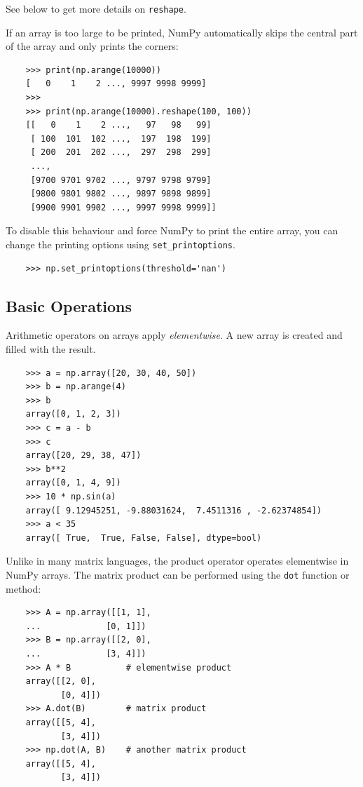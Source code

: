 \documentclass[UTF8]{article}
\begin{document}
See below to get more details on \texttt{reshape}.

If an array is too large to be printed, NumPy automatically skips the central part of the array and
only prints the corners:
\begin{verbatim}
    >>> print(np.arange(10000))
    [   0    1    2 ..., 9997 9998 9999]
    >>>
    >>> print(np.arange(10000).reshape(100, 100))
    [[   0    1    2 ...,   97   98   99]
     [ 100  101  102 ...,  197  198  199]
     [ 200  201  202 ...,  297  298  299]
     ...,
     [9700 9701 9702 ..., 9797 9798 9799]
     [9800 9801 9802 ..., 9897 9898 9899]
     [9900 9901 9902 ..., 9997 9998 9999]]
\end{verbatim}

To disable this behaviour and force NumPy to print the entire array, you can change the printing
options using \texttt{set\_printoptions}.
\begin{verbatim}
    >>> np.set_printoptions(threshold='nan')
\end{verbatim}

\subsection{Basic Operations}
Arithmetic operators on arrays apply \emph{elementwise}. A new array is created and filled with the
result.
\begin{verbatim}
    >>> a = np.array([20, 30, 40, 50])
    >>> b = np.arange(4)
    >>> b
    array([0, 1, 2, 3])
    >>> c = a - b
    >>> c
    array([20, 29, 38, 47])
    >>> b**2
    array([0, 1, 4, 9])
    >>> 10 * np.sin(a)
    array([ 9.12945251, -9.88031624,  7.4511316 , -2.62374854])
    >>> a < 35
    array([ True,  True, False, False], dtype=bool)
\end{verbatim}

Unlike in many matrix languages, the product operator \texttt{\*} operates elementwise in NumPy
arrays. The matrix product can be performed using the \texttt{dot} function or method:
\begin{verbatim}
    >>> A = np.array([[1, 1],
    ...             [0, 1]])
    >>> B = np.array([[2, 0],
    ...             [3, 4]])
    >>> A * B           # elementwise product
    array([[2, 0],
           [0, 4]])
    >>> A.dot(B)        # matrix product
    array([[5, 4],
           [3, 4]])
    >>> np.dot(A, B)    # another matrix product
    array([[5, 4],
           [3, 4]])
\end{verbatim}
\end{document}
